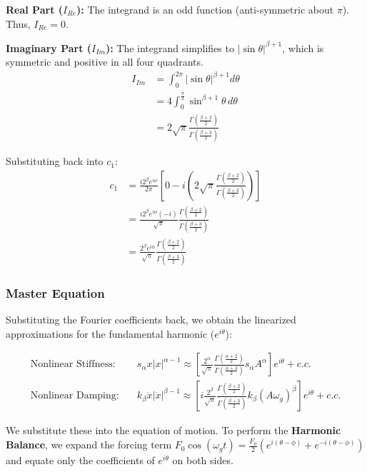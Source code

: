 \documentclass[10pt,twoside]{report}
\begin{document}
\textbf{Real Part ($I_{Re}$):} The integrand is an odd function (anti-symmetric about $\pi$). Thus, $I_{Re} = 0$.

\textbf{Imaginary Part ($I_{Im}$):} The integrand simplifies to $|\sin\theta|^{\beta+1}$, which is symmetric and positive in all four quadrants.
\begin{align*}
    I_{Im} &= \int_{0}^{2\pi} |\sin\theta|^{\beta+1} d\theta \\
           &= 4 \int_{0}^{\frac{\pi}{2}} \sin^{\beta+1}\theta \, d\theta \\
           &= 2\sqrt{\pi} \frac{\Gamma\left(\frac{\beta+2}{2}\right)}{\Gamma\left(\frac{\beta+3}{2}\right)}
\end{align*}

Substituting back into $c_1$:
\begin{align*}
    c_1 &= \frac{i 2^\beta e^{i\phi}}{2\pi} \left[ 0 - i \left( 2\sqrt{\pi} \frac{\Gamma\left(\frac{\beta+2}{2}\right)}{\Gamma\left(\frac{\beta+3}{2}\right)} \right) \right] \\
         &= \frac{i 2^\beta e^{i\phi} (-i)}{\sqrt{\pi}} \frac{\Gamma\left(\frac{\beta+2}{2}\right)}{\Gamma\left(\frac{\beta+3}{2}\right)} \\
         &= \frac{2^\beta e^{i\phi}}{\sqrt{\pi}} \frac{\Gamma\left(\frac{\beta+2}{2}\right)}{\Gamma\left(\frac{\beta+3}{2}\right)}
\end{align*}
\subsubsection{Master Equation}

Substituting the Fourier coefficients back, we obtain the linearized approximations for the fundamental harmonic ($e^{i\theta}$):

\begin{align*}
    \text{Nonlinear Stiffness:} \quad & s_{\alpha} x |x|^{\alpha-1} \approx \left[ \frac{2^\alpha}{\sqrt{\pi}} \frac{\Gamma(\frac{\alpha+2}{2})}{\Gamma(\frac{\alpha+3}{2})} s_{\alpha} A^{\alpha} \right] e^{i\theta} + c.c. \\
    \text{Nonlinear Damping:} \quad & k_{\beta} \dot{x} |\dot{x}|^{\beta-1} \approx \left[ i \frac{2^\beta}{\sqrt{\pi}} \frac{\Gamma(\frac{\beta+2}{2})}{\Gamma(\frac{\beta+3}{2})} k_{\beta} (A\omega_g)^{\beta} \right] e^{i\theta} + c.c.
\end{align*}

We substitute these into the equation of motion. To perform the \textbf{Harmonic Balance}, we expand the forcing term $F_0 \cos(\omega_g t) = \frac{F_0}{2} (e^{i(\theta-\phi)} + e^{-i(\theta-\phi)})$ and equate only the coefficients of $e^{i\theta}$ on both sides.
\end{document}
